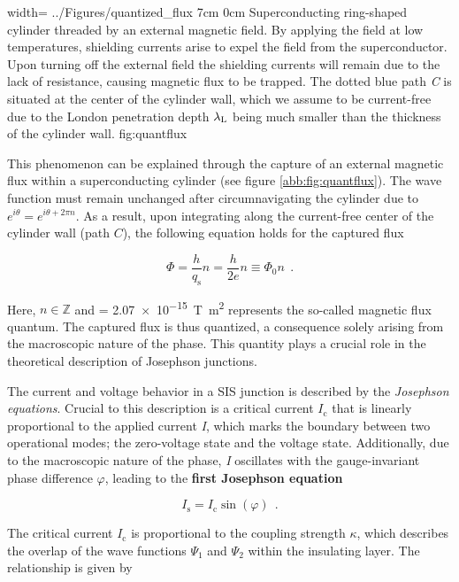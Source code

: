 {width=\textwidth}
{../Figures/quantized_flux}
{7cm}
{0cm}
{Superconducting ring-shaped cylinder threaded by an external magnetic field. By applying the field at low temperatures, shielding currents arise to expel the field from the superconductor. Upon turning off the external field the shielding currents will remain due to the lack of resistance, causing magnetic flux to be trapped. The dotted blue path \textit{C} is situated at the center of the cylinder wall, which we assume to be current-free due to the London penetration depth $\lambda_{\rm L}$ being much smaller than the thickness of the cylinder wall.} 
{fig:quantflux}

This phenomenon can be explained through the capture of an external magnetic flux within a superconducting cylinder (see figure \ref{abb:fig:quantflux}). The wave function must remain unchanged after circumnavigating the cylinder due to $e^{i\theta} = e^{i\theta + 2\pi n}$. As a result, upon integrating along the current-free center of the cylinder wall (path $C$), the following equation holds for the captured flux \cite{Deaver1961}

\begin{equation}\label{fq}
\Phi = \frac{h}{q_\mathrm{s}}n = \frac{h}{2e}n \equiv \Phi_0n \ \ .
\end{equation}

Here, $n\in\mathbb{Z}$ and \unit{\fq} = \qty{2.07e-15}{\tesla\metre\squared} \cite{CODATA2018} represents the so-called magnetic flux quantum. The captured flux is thus quantized, a consequence solely arising from the macroscopic nature of the phase. This quantity plays a crucial role in the theoretical description of Josephson junctions.


The current and voltage behavior in a SIS junction is described by the \textit{Josephson equations}. Crucial to this description is a critical current \textit{$I_\mathrm{c}$} that is linearly proportional to the applied current \textit{I}, which marks the boundary between two operational modes; the zero-voltage state and the voltage state. Additionally, due to the macroscopic nature of the phase, \textit{I} oscillates with the gauge-invariant phase difference $\varphi$, leading to the \textbf{first Josephson equation} \cite{Josephson1965}

\begin{equation}
\label{1.JE}
I_\mathrm{s} = I_\mathrm{c}\sin(\varphi) \ \ .
\end{equation}

The critical current $I_\mathrm{c}$ is proportional to the coupling strength $\kappa$, which describes the overlap of the wave functions $\Psi_1$ and $\Psi_2$ within the insulating layer. The relationship is given by

